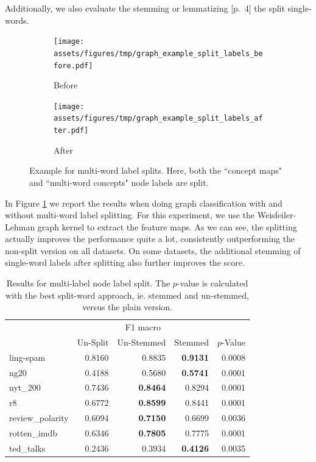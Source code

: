 Additionally, we also evaluate the stemming or lemmatizing [p.~4]\cite{Manning2000} the split single-words.

\begin{figure}[htb!]
	\centering
	\begin{subfigure}[t]{.4\linewidth}	{\texttt{[image: assets/figures/tmp/graph\_example\_split\_labels\_before.pdf]}}
		\caption{Before}
	\end{subfigure}
\hspace{2cm}
	\begin{subfigure}[t]{.4\linewidth}	{\texttt{[image: assets/figures/tmp/graph\_example\_split\_labels\_after.pdf]}}
		\caption{After}
	\end{subfigure}
	\caption[Example: Multi-word node labels Splitting]{Example for multi-word label splits. Here, both the ``concept maps" and ``multi-word concepts" node labels are  split.}\label{fig:example_split_labels}
\end{figure}

In Figure \ref{table:results_multi_label_split} we report the results when doing graph classification with and without multi-word label splitting.
For this experiment, we use the Weisfeiler-Lehman graph kernel to extract the feature maps.
As we can see, the splitting actually improves the performance quite a lot, consistently outperforming the non-split version on all datasets.
On some datasets, the additional stemming of single-word labels after splitting also further improves the score.

\begin{table}[htb!]
	\centering
\begin{tabular}{lrrrr}
\toprule
	{} & \multicolumn{3}{c}{F1 macro}  &   \\
	 &  Un-Split  &  Un-Stemmed &  Stemmed &   $p$-Value  \\
	\midrule
	ling-spam       & 0.8160 & 0.8835 & \textbf{0.9131} & 0.0008 \\
	ng20            & 0.4188 & 0.5680 & \textbf{0.5741} & 0.0001 \\
	nyt\_200         & 0.7436 & \textbf{0.8464} & 0.8294 & 0.0001 \\
	r8              & 0.6772 & \textbf{0.8599} & 0.8441 & 0.0001 \\
	review\_polarity & 0.6094 & \textbf{0.7150} & 0.6699 & 0.0036 \\
	rotten\_imdb     & 0.6346 & \textbf{0.7805} & 0.7775 & 0.0001 \\
	ted\_talks       & 0.2436 & 0.3934 & \textbf{0.4126} & 0.0035 \\
	\bottomrule
\end{tabular}
\caption[Results: Multi-label split]{Results for multi-label node label split. The $p$-value is calculated with the best split-word approach, ie. stemmed and un-stemmed, versus the plain version.}\label{table:results_multi_label_split}
\end{table}

